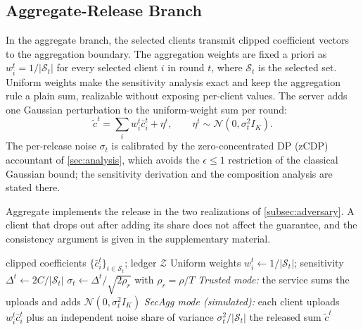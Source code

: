 \documentclass[a4paper,fleqn]{cas-dc}
\begin{document}
\subsection{Aggregate-Release Branch}
\label{subsec:agg-release}
\par
In the aggregate branch, the selected clients transmit clipped coefficient vectors to the aggregation boundary. The aggregation weights are fixed a priori as $w_i^t=1/|\mathcal{S}_t|$ for every selected client $i$ in round $t$, where $\mathcal{S}_t$ is the selected set. Uniform weights make the sensitivity analysis exact and keep the aggregation rule a plain sum, realizable without exposing per-client values. The server adds one Gaussian perturbation to the uniform-weight sum per round:
\begin{equation}
\tilde c^t=\sum_i w_i^t\bar c_i^t+\eta^t,\qquad \eta^t\sim\mathcal{N}(0,\sigma_t^2 I_K).
\end{equation}
The per-release noise $\sigma_t$ is calibrated by the zero-concentrated DP (zCDP) accountant of \cref{sec:analysis}, which avoids the $\epsilon\le 1$ restriction of the classical Gaussian bound; the sensitivity derivation and the composition analysis are stated there.
\par
Aggregate implements the release in the two realizations of \cref{subsec:adversary}. A client that drops out after adding its share does not affect the guarantee, and the consistency argument is given in the supplementary material.
\par
\begin{algorithm}[tbp]
\caption{Aggregate release (Aggregate)}
\label{alg:aggrelease}
\begin{algorithmic}[1]
\Require clipped coefficients $\{\bar c_i^t\}_{i\in\mathcal{S}_t}$; ledger
$\mathcal{Z}$
\State Uniform weights $w_i^t\gets 1/|\mathcal{S}_t|$; sensitivity
$\Delta^t\gets 2C/|\mathcal{S}_t|$
\State $\sigma_t\gets\Delta^t/\sqrt{2\rho_r}$ with $\rho_r=\rho/T$
\State \emph{Trusted mode:} the service sums the uploads and adds
$\mathcal{N}(0,\sigma_t^2I_K)$
\State \emph{SecAgg mode (simulated):} each client uploads $w_i^t\bar c_i^t$
plus an independent noise share of variance $\sigma_t^2/|\mathcal{S}_t|$
\State \Return the released sum $\tilde c^t$
\end{algorithmic}
\end{algorithm}
\par
\end{document}
